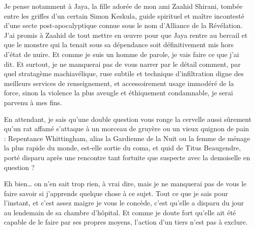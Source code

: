 Je pense notamment à Jaya, la fille adorée de mon ami Zaahid Shirani, tombée entre les griffes d’un certain Simon Keskula, guide spirituel et maître incontesté d’une secte post-apocalyptique connue sous le nom d’Alliance de la Révélation. J’ai promis à Zaahid de tout mettre en œuvre pour que Jaya rentre au bercail et que le monstre qui la tenait sous sa dépendance soit définitivement mis hors d’état de nuire. Et comme je suis un homme de parole, je vais faire ce que j’ai dit. Et surtout, je ne manquerai pas de vous narrer par le détail comment, par quel stratagème machiavélique, ruse subtile et technique d’infiltration digne des meilleurs services de renseignement, et accessoirement usage immodéré de la force, sinon la violence la plus aveugle et éthiquement condamnable, je serai parvenu à mes fins.

En attendant, je sais qu’une double question vous ronge la cervelle aussi sûrement qu’un rat affamé s’attaque à un morceau de gruyère ou un vieux quignon de pain : Repentance Whittingham, alias la Gardienne de la Nuit ou la femme de ménage la plus rapide du monde, est-elle sortie du coma, et quid de Titus Beaugendre, porté disparu après une rencontre tant fortuite que suspecte avec la demoiselle en question ?

Eh bien… on n’en sait trop rien, à vrai dire, mais je ne manquerai pas de vous le faire savoir si j’apprends quelque chose à ce sujet. Tout ce que je sais pour l’instant, et c’est assez maigre je vous le concède, c’est qu’elle a disparu du jour au lendemain de sa chambre d’hôpital. Et comme je doute fort qu’elle ait été capable de le faire par ses propres moyens, l’action d’un tiers n’est pas à exclure.

